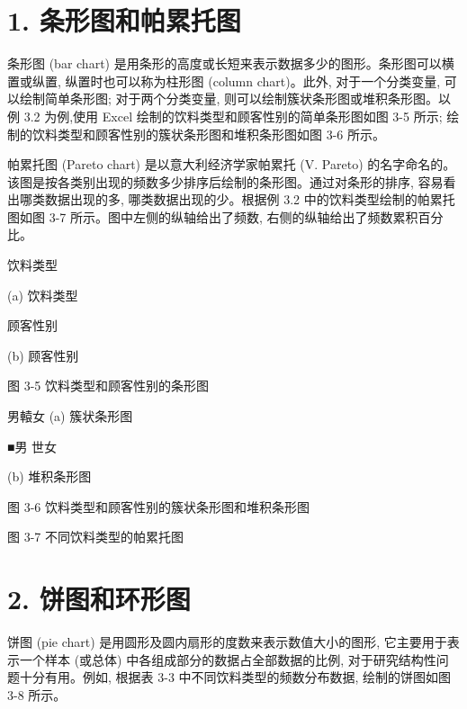 \documentclass[10pt]{article}
\begin{document}
\begin{CJK*}{UTF8}{bsmi}
\section*{1. 条形图和帕累托图}
条形图 (bar chart) 是用条形的高度或长短来表示数据多少的图形。条形图可以横置或纵置, 纵置时也可以称为柱形图 (column chart)。此外, 对于一个分类变量, 可以绘制简单条形图; 对于两个分类变量, 则可以绘制簇状条形图或堆积条形图。以例 3.2 为例,使用 Excel 绘制的饮料类型和顾客性别的简单条形图如图 3-5 所示; 绘制的饮料类型和顾客性别的簇状条形图和堆积条形图如图 3-6 所示。

帕累托图 (Pareto chart) 是以意大利经济学家帕累托 (V. Pareto) 的名字命名的。该图是按各类别出现的频数多少排序后绘制的条形图。通过对条形的排序, 容易看出哪类数据出现的多, 哪类数据出现的少。根据例 3.2 中的饮料类型绘制的帕累托图如图 3-7 所示。图中左侧的纵轴给出了频数, 右侧的纵轴给出了频数累积百分比。

\begin{center}
\end{center}

饮料类型

(a) 饮料类型

\begin{center}
\end{center}

顾客性别

(b) 顾客性别

图 3-5 饮料类型和顾客性别的条形图

\begin{center}
\end{center}

男轅女 (a) 簇状条形图

\begin{center}
\end{center}

■男 世女

(b) 堆积条形图

图 3-6 饮料类型和顾客性别的簇状条形图和堆积条形图

\begin{center}
\end{center}

图 3-7 不同饮料类型的帕累托图

\section*{2. 饼图和环形图}
饼图 (pie chart) 是用圆形及圆内扇形的度数来表示数值大小的图形, 它主要用于表示一个样本 (或总体) 中各组成部分的数据占全部数据的比例, 对于研究结构性问题十分有用。例如, 根据表 3-3 中不同饮料类型的频数分布数据, 绘制的饼图如图 3-8 所示。


\end{CJK*}
\end{document}
